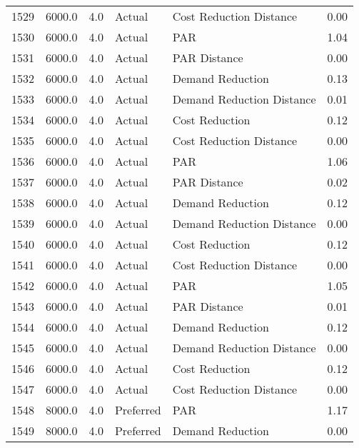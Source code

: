 \begin{longtable}{lrrllr}
1529 &       6000.0 &     4.0 &         Actual &    Cost Reduction Distance &   0.00 \\
1530 &       6000.0 &     4.0 &         Actual &                        PAR &   1.04 \\
1531 &       6000.0 &     4.0 &         Actual &               PAR Distance &   0.00 \\
1532 &       6000.0 &     4.0 &         Actual &           Demand Reduction &   0.13 \\
1533 &       6000.0 &     4.0 &         Actual &  Demand Reduction Distance &   0.01 \\
1534 &       6000.0 &     4.0 &         Actual &             Cost Reduction &   0.12 \\
1535 &       6000.0 &     4.0 &         Actual &    Cost Reduction Distance &   0.00 \\
1536 &       6000.0 &     4.0 &         Actual &                        PAR &   1.06 \\
1537 &       6000.0 &     4.0 &         Actual &               PAR Distance &   0.02 \\
1538 &       6000.0 &     4.0 &         Actual &           Demand Reduction &   0.12 \\
1539 &       6000.0 &     4.0 &         Actual &  Demand Reduction Distance &   0.00 \\
1540 &       6000.0 &     4.0 &         Actual &             Cost Reduction &   0.12 \\
1541 &       6000.0 &     4.0 &         Actual &    Cost Reduction Distance &   0.00 \\
1542 &       6000.0 &     4.0 &         Actual &                        PAR &   1.05 \\
1543 &       6000.0 &     4.0 &         Actual &               PAR Distance &   0.01 \\
1544 &       6000.0 &     4.0 &         Actual &           Demand Reduction &   0.12 \\
1545 &       6000.0 &     4.0 &         Actual &  Demand Reduction Distance &   0.00 \\
1546 &       6000.0 &     4.0 &         Actual &             Cost Reduction &   0.12 \\
1547 &       6000.0 &     4.0 &         Actual &    Cost Reduction Distance &   0.00 \\
1548 &       8000.0 &     4.0 &      Preferred &                        PAR &   1.17 \\
1549 &       8000.0 &     4.0 &      Preferred &           Demand Reduction &   0.00 \\

\end{longtable}
